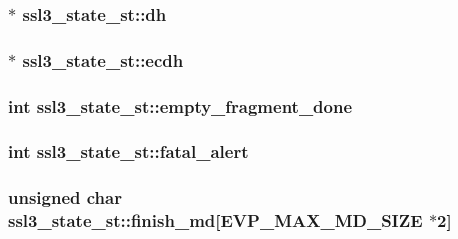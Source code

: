 \subsubsection[{\texorpdfstring{dh}{dh}}]{$\ast$ ssl3\+\_\+state\+\_\+st\+::dh}\hypertarget{structssl3__state__st_a46431d3abe4c6f2bfc136eeff06b2b69}{}\label{structssl3__state__st_a46431d3abe4c6f2bfc136eeff06b2b69}
\subsubsection[{\texorpdfstring{ecdh}{ecdh}}]{$\ast$ ssl3\+\_\+state\+\_\+st\+::ecdh}\hypertarget{structssl3__state__st_a19856df106252dda0aeb6b344ccdf86b}{}\label{structssl3__state__st_a19856df106252dda0aeb6b344ccdf86b}
\subsubsection[{\texorpdfstring{empty\+\_\+fragment\+\_\+done}{empty_fragment_done}}]{\setlength{\rightskip}{0pt plus 5cm}int ssl3\+\_\+state\+\_\+st\+::empty\+\_\+fragment\+\_\+done}\hypertarget{structssl3__state__st_a97e5546af9e51f39f4a6c9f7b73ba1b1}{}\label{structssl3__state__st_a97e5546af9e51f39f4a6c9f7b73ba1b1}
\subsubsection[{\texorpdfstring{fatal\+\_\+alert}{fatal_alert}}]{\setlength{\rightskip}{0pt plus 5cm}int ssl3\+\_\+state\+\_\+st\+::fatal\+\_\+alert}\hypertarget{structssl3__state__st_ab01c5f2c4cc053af753e0d2a61c562cb}{}\label{structssl3__state__st_ab01c5f2c4cc053af753e0d2a61c562cb}
\subsubsection[{\texorpdfstring{finish\+\_\+md}{finish_md}}]{\setlength{\rightskip}{0pt plus 5cm}unsigned char ssl3\+\_\+state\+\_\+st\+::finish\+\_\+md\mbox{[}{\bf E\+V\+P\+\_\+\+M\+A\+X\+\_\+\+M\+D\+\_\+\+S\+I\+ZE} $\ast$2\mbox{]}}\hypertarget{structssl3__state__st_a13a85dc9c38577f18415d6963d815632}{}\label{structssl3__state__st_a13a85dc9c38577f18415d6963d815632}
